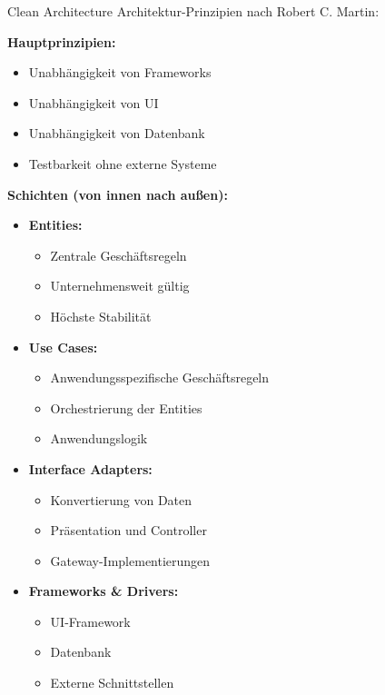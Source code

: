 \begin{concept}{Clean Architecture}
Architektur-Prinzipien nach Robert C. Martin:

\textbf{Hauptprinzipien:}
\begin{itemize}
    \item Unabhängigkeit von Frameworks
    \item Unabhängigkeit von UI
    \item Unabhängigkeit von Datenbank
    \item Testbarkeit ohne externe Systeme
\end{itemize}

\textbf{Schichten (von innen nach außen):}
\begin{itemize}
    \item \textbf{Entities:} 
    \begin{itemize}
        \item Zentrale Geschäftsregeln
        \item Unternehmensweit gültig
        \item Höchste Stabilität
    \end{itemize}
    
    \item \textbf{Use Cases:}
    \begin{itemize}
        \item Anwendungsspezifische Geschäftsregeln
        \item Orchestrierung der Entities
        \item Anwendungslogik
    \end{itemize}
    
    \item \textbf{Interface Adapters:}
    \begin{itemize}
        \item Konvertierung von Daten
        \item Präsentation und Controller
        \item Gateway-Implementierungen
    \end{itemize}
    
    \item \textbf{Frameworks \& Drivers:}
    \begin{itemize}
        \item UI-Framework
        \item Datenbank
        \item Externe Schnittstellen
    \end{itemize}
\end{itemize}
\end{concept}

